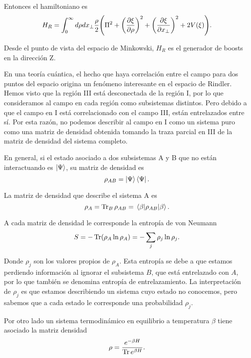 Entonces el hamiltoniano es
\begin{equation}
  H_R=\int_0^\infty d\rho dx_\perp \frac{\rho}{2}\qty(\Pi^2+\qty(\pdv{\xi}{\rho})^2+\qty(\pdv{\xi}{x_\perp})^2+2V(\xi)).
\end{equation}

Desde el punto de vista del espacio de Minkowski, $H_R$ es el generador de boosts en 
la dirección Z.

En una teoría cuántica, el hecho que haya correlación entre el campo para dos puntos
del espacio origina un fenómeno interesante en el espacio de Rindler. 
Hemos visto que la región III está desconectada de la región I, por lo que consideramos
al campo en cada región como subsistemas distintos. Pero debido a que el campo en I está
correlacionado con el campo III, están entrelazados entre sí.
Por esta razón, no podemos describir al campo en I como un sistema puro como una
matriz de densidad obtenida tomando la traza parcial en III de la matriz de densidad
del sistema completo.

En general, si el estado asociado a dos subsistemas A y B que no están interactuando 
es $\ket{\Psi}$, su matriz de densidad es
\begin{equation}
  \rho_{AB}=\ket{\Psi}\bra{\Psi}.
\end{equation}

La matriz de densidad que describe el sistema A es
\begin{equation}
  \rho_{A}=\Tr_B \rho_{AB}=\expval{\rho_{AB}}{\beta}.
\end{equation}
 
A cada matriz de densidad le corresponde la entropía de von Neumann
\begin{equation}
  S=-\Tr (\rho_A \ln \rho_A)=-\sum_j \rho_j \ln \rho_j.
\end{equation}

Donde $\rho_j$ son los valores propios de $\rho_A$.
Esta entropía se debe a que estamos perdiendo información al ignorar el subsistema $B$, que 
está entrelazado con $A$, por lo que también se denomina entropía de entrelazamiento.
La interpretación de $\rho_j$ es que estamos describiendo un sistema cuyo estado no 
conocemos, pero sabemos que a cada estado le corresponde una probabilidad $\rho_j$.

Por otro lado un sistema termodinámico en equilibrio a temperatura $\beta$ tiene 
asociado la matriz densidad 
\begin{equation}
  \rho=\frac{e^{-\beta H}}{\Tr e^{\beta H}}.
\end{equation}

